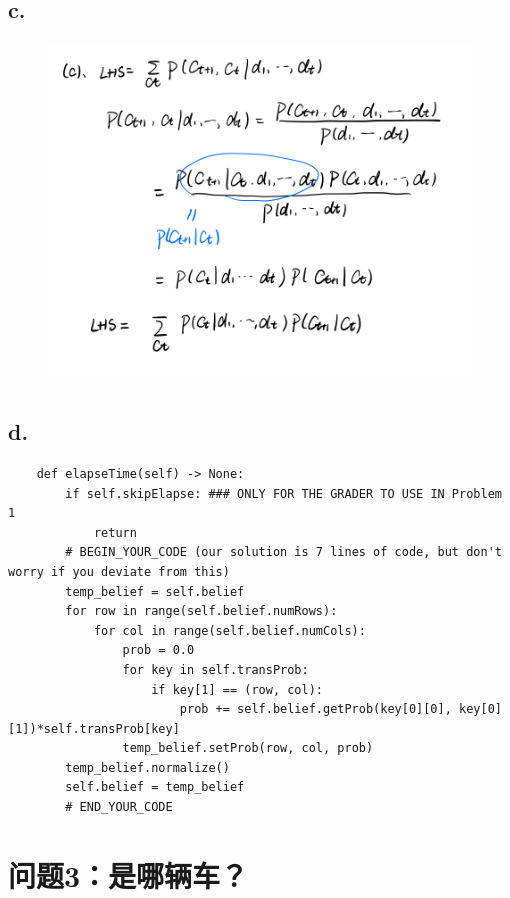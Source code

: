 \documentclass{article}
\begin{document}
\subsection*{c.}
\begin{figure}[H]
    \centering
    \includegraphics[scale=0.5]{2c.png}
\end{figure}
\subsection*{d.}
\begin{lstlisting}
    def elapseTime(self) -> None:
        if self.skipElapse: ### ONLY FOR THE GRADER TO USE IN Problem 1
            return
        # BEGIN_YOUR_CODE (our solution is 7 lines of code, but don't worry if you deviate from this)
        temp_belief = self.belief
        for row in range(self.belief.numRows):
            for col in range(self.belief.numCols):
                prob = 0.0
                for key in self.transProb:
                    if key[1] == (row, col):
                        prob += self.belief.getProb(key[0][0], key[0][1])*self.transProb[key]
                temp_belief.setProb(row, col, prob)
        temp_belief.normalize()
        self.belief = temp_belief
        # END_YOUR_CODE
\end{lstlisting}


\section*{问题3：是哪辆车？}
\end{document}
